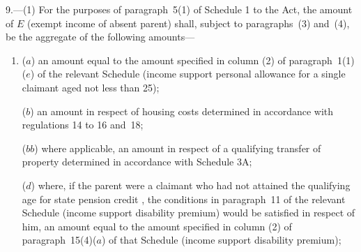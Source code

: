 \documentclass[12pt,a4paper]{article}
\begin{document}
9.—(1) For the purposes of paragraph~5(1) of Schedule 1 to the Act, the amount of $E$ (exempt income of absent parent) shall, subject to paragraphs~(3) and~(4), be the aggregate of the following amounts—
\begin{enumerate}\item[]
($a$) an amount equal to the amount specified in column (2) of paragraph~1(1)($e$) of the relevant Schedule (income support personal allowance for a single claimant aged not less than 25);

($b$) an amount in respect of housing costs determined in accordance with regulations 14 to 
16 and~18;  %

($bb$) where applicable, an amount in respect of a qualifying transfer of property determined in accordance with Schedule 3A;


%
%
%

($d$) where, if the parent were a claimant 
who had not attained the qualifying age for state pension credit%
, the conditions in paragraph~11 of the relevant Schedule (income support disability premium) would be satisfied in respect of him, an amount equal to the amount specified in column (2) of paragraph~15(4)($a$) of that Schedule (income support disability premium);


\end{enumerate}
\end{document}

